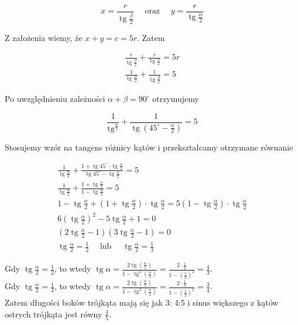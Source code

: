 \documentclass[10pt]{article}
\begin{document}
$$
x=\frac{r}{\operatorname{tg} \frac{\beta}{2}} \quad \text { oraz } \quad y=\frac{r}{\operatorname{tg} \frac{\alpha}{2}}
$$

Z założenia wiemy, że $x+y=c=5 r$. Zatem

$$
\begin{gathered}
\frac{r}{\operatorname{tg} \frac{\beta}{2}}+\frac{r}{\operatorname{tg} \frac{\alpha}{2}}=5 r \\
\frac{1}{\operatorname{tg} \frac{\alpha}{2}}+\frac{1}{\operatorname{tg} \frac{\beta}{2}}=5
\end{gathered}
$$

Po uwzględnieniu zależności $\alpha+\beta=90^{\circ}$ otrzymujemy

$$
\frac{1}{\operatorname{tg}^{\frac{\alpha}{2}}}+\frac{1}{\operatorname{tg}\left(45^{\circ}-\frac{\alpha}{2}\right)}=5
$$

Stosujemy wzór na tangens różnicy kątów i przekształcamy otrzymane równanie

$$
\begin{gathered}
\frac{1}{\operatorname{tg} \frac{\alpha}{2}}+\frac{1+\operatorname{tg} 45^{\circ} \cdot \operatorname{tg} \frac{\alpha}{2}}{\operatorname{tg} 45^{\circ}-\operatorname{tg} \frac{\alpha}{2}}=5 \\
\frac{1}{\operatorname{tg} \frac{\alpha}{2}}+\frac{1+\operatorname{tg} \frac{\alpha}{2}}{1-\operatorname{tg} \frac{\alpha}{2}}=5 \\
1-\operatorname{tg} \frac{\alpha}{2}+\left(1+\operatorname{tg} \frac{\alpha}{2}\right) \cdot \operatorname{tg} \frac{\alpha}{2}=5\left(1-\operatorname{tg} \frac{\alpha}{2}\right) \cdot \operatorname{tg} \frac{\alpha}{2} \\
6\left(\operatorname{tg} \frac{\alpha}{2}\right)^{2}-5 \operatorname{tg} \frac{\alpha}{2}+1=0 \\
\left(2 \operatorname{tg} \frac{\alpha}{2}-1\right)\left(3 \operatorname{tg} \frac{\alpha}{2}-1\right)=0 \\
\operatorname{tg} \frac{\alpha}{2}=\frac{1}{2} \quad \text { lub } \quad \operatorname{tg} \frac{\alpha}{2}=\frac{1}{3}
\end{gathered}
$$

Gdy $\operatorname{tg} \frac{\alpha}{2}=\frac{1}{2}$, to wtedy $\operatorname{tg} \alpha=\frac{2 \operatorname{tg}\left(\frac{\alpha}{2}\right)}{1-\operatorname{tg}^{2}\left(\frac{\alpha}{2}\right)}=\frac{2 \cdot \frac{1}{2}}{1-\left(\frac{1}{2}\right)^{2}}=\frac{4}{3}$.\\
Gdy $\operatorname{tg} \frac{\alpha}{2}=\frac{1}{3}$, to wtedy $\operatorname{tg} \alpha=\frac{2 \operatorname{tg}\left(\frac{\alpha}{2}\right)}{1-\operatorname{tg}^{2}\left(\frac{\alpha}{2}\right)}=\frac{2 \cdot \frac{1}{3}}{1-\left(\frac{1}{3}\right)^{2}}=\frac{3}{4}$.\\
Zatem długości boków trójkąta mają się jak 3: 4:5 i sinus większego z kątów ostrych trójkąta jest równy $\frac{4}{5}$.
\end{document}
